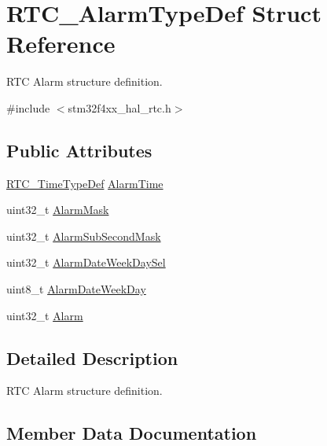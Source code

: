 \hypertarget{struct_r_t_c___alarm_type_def}{}\section{R\+T\+C\+\_\+\+Alarm\+Type\+Def Struct Reference}
\label{struct_r_t_c___alarm_type_def}


R\+TC Alarm structure definition.  




{\ttfamily \#include $<$stm32f4xx\+\_\+hal\+\_\+rtc.\+h$>$}

\subsection*{Public Attributes}
\begin{DoxyCompactItemize}
\item 
\hyperlink{struct_r_t_c___time_type_def}{R\+T\+C\+\_\+\+Time\+Type\+Def} \hyperlink{struct_r_t_c___alarm_type_def_a1e50b47e1b3cb1cf09dee1b9e61028c6}{Alarm\+Time}
\item 
uint32\+\_\+t \hyperlink{struct_r_t_c___alarm_type_def_a6d5665858df4c99e589beebe7f2d120b}{Alarm\+Mask}
\item 
uint32\+\_\+t \hyperlink{struct_r_t_c___alarm_type_def_aa7f311cd270c215530acf93b454db223}{Alarm\+Sub\+Second\+Mask}
\item 
uint32\+\_\+t \hyperlink{struct_r_t_c___alarm_type_def_a366ce4c7ad04d5a29550d30d93361324}{Alarm\+Date\+Week\+Day\+Sel}
\item 
uint8\+\_\+t \hyperlink{struct_r_t_c___alarm_type_def_a0c437cb24f8b12e753e522bf0c48a4d7}{Alarm\+Date\+Week\+Day}
\item 
uint32\+\_\+t \hyperlink{struct_r_t_c___alarm_type_def_a2f11f60569f34b15c09096928f30ab24}{Alarm}
\end{DoxyCompactItemize}


\subsection{Detailed Description}
R\+TC Alarm structure definition. 

\subsection{Member Data Documentation}
